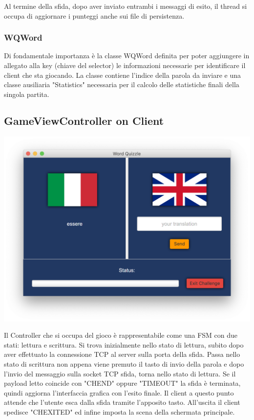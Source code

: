 \documentclass{article}
\begin{document}
Al termine della sfida, dopo aver inviato entrambi i messaggi di esito, il thread si occupa di aggiornare i punteggi anche sui file di persistenza.

\subsubsection{WQWord}
Di fondamentale importanza è la classe WQWord definita per poter aggiungere in allegato alla key (chiave del selector) le informazioni necessarie per identificare il client che sta giocando. La classe contiene l'indice della parola da inviare e una classe ausiliaria "Statistics" necessaria per il calcolo delle statistiche finali della singola partita.

\subsection{GameViewController on Client}
\begin{center}
\includegraphics[scale=0.5]{quizzlegame.png}
\end{center}
Il Controller che si occupa del gioco è rappresentabile come una FSM con due stati: lettura e scrittura. Si trova inizialmente nello stato di lettura, subito dopo aver effettuato la connessione TCP al server sulla porta della sfida. Passa nello stato di scrittura non appena viene premuto il tasto di invio della parola e dopo l'invio del messaggio sulla socket TCP sfida, torna nello stato di lettura. 
Se il payload letto coincide con "CHEND" oppure "TIMEOUT" la sfida è terminata, quindi aggiorna l'interfaccia grafica con l'esito finale. Il client a questo punto attende che l'utente esca dalla sfida tramite l'apposito tasto. All'uscita il client spedisce "CHEXITED" ed infine imposta la scena della schermata principale.



\end{document}
